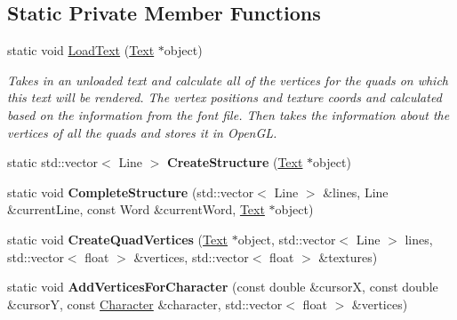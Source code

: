 \subsection*{Static Private Member Functions}
\begin{DoxyCompactItemize}
\item 
static void \hyperlink{class_flounder_1_1_text_a46ac3dfca95a9c97686b1a71b6795177}{Load\+Text} (\hyperlink{class_flounder_1_1_text}{Text} $\ast$object)
\begin{DoxyCompactList}\small\item\em Takes in an unloaded text and calculate all of the vertices for the quads on which this text will be rendered. The vertex positions and texture coords and calculated based on the information from the font file. Then takes the information about the vertices of all the quads and stores it in Open\+GL. \end{DoxyCompactList}\item 
\mbox{\label{class_flounder_1_1_text_a1c89d05b92047bdf36c9b6fdf299074f}} 
static std\+::vector$<$ Line $>$ {\bfseries Create\+Structure} (\hyperlink{class_flounder_1_1_text}{Text} $\ast$object)
\item 
\mbox{\label{class_flounder_1_1_text_a0543c5034bb50c72379edbd29cfe5458}} 
static void {\bfseries Complete\+Structure} (std\+::vector$<$ Line $>$ \&lines, Line \&current\+Line, const Word \&current\+Word, \hyperlink{class_flounder_1_1_text}{Text} $\ast$object)
\item 
\mbox{\label{class_flounder_1_1_text_aa75a717d37d826524cae5a70971afc17}} 
static void {\bfseries Create\+Quad\+Vertices} (\hyperlink{class_flounder_1_1_text}{Text} $\ast$object, std\+::vector$<$ Line $>$ lines, std\+::vector$<$ float $>$ \&vertices, std\+::vector$<$ float $>$ \&textures)
\item 
\mbox{\label{class_flounder_1_1_text_ae94c39714191c38ecee4cad38152c79a}} 
static void {\bfseries Add\+Vertices\+For\+Character} (const double \&cursorX, const double \&cursorY, const \hyperlink{class_flounder_1_1_character}{Character} \&character, std\+::vector$<$ float $>$ \&vertices)
\item 
\mbox{\label{class_flounder_1_1_text_a22072da42fcfaaf41212a3d74252859c}} 

\end{DoxyCompactItemize}
